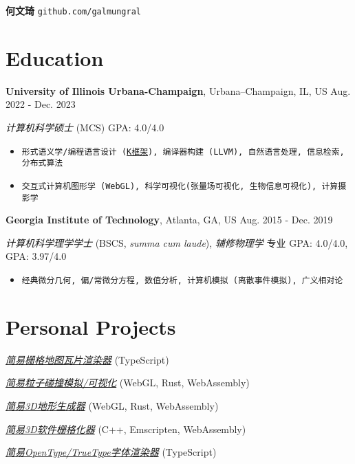 \documentclass[11pt,twocolumn]{article}
\begin{document}
\newpage 

{\Huge\textbf{何文琦}} \quad \texttt{github.com/galmungral}


\section*{Education}

\textbf{University of Illinois Urbana-Champaign}, Urbana–Champaign, IL, US \hfill Aug. 2022 - Dec. 2023

\textit{计算机科学硕士} (MCS)  \hfill GPA: 4.0/4.0 

\begin{itemize}
\item \texttt{形式语义学/编程语言设计 (\href{https://kframework.org/}{K框架}), 编译器构建 (LLVM), 自然语言处理, 信息检索, 分布式算法}
\item \texttt{交互式计算机图形学 (WebGL), 科学可视化(张量场可视化, 生物信息可视化), 计算摄影学}
\end{itemize}

\textbf{Georgia Institute of Technology}, Atlanta, GA, US \hfill Aug. 2015 - Dec. 2019

\textit{计算机科学理学学士} (BSCS, \textit{summa cum laude}), \textit{辅修物理学} \hfill 专业 GPA: 4.0/4.0, GPA: 3.97/4.0

\begin{itemize}
\item \texttt{经典微分几何, 偏/常微分方程, 数值分析, 计算机模拟 (离散事件模拟), 广义相对论}
\end{itemize}

\section*{Personal Projects}

\href{https://galmungral.github.io/mercator}{\textit{简易栅格地图瓦片渲染器}} \hfill (TypeScript)

\href{https://galmungral.github.io/particle-simulation}{\textit{简易粒子碰撞模拟/可视化}} 
\hfill (WebGL, Rust, WebAssembly)

\href{https://galmungral.github.io/terrain-generator}{\textit{简易3D地形生成器}} \hfill (WebGL, Rust, WebAssembly)

\href{https://galmungral.github.io/rasterizer?file=billboard.txt}{\textit{简易3D软件栅格化器}} \hfill (C++, Emscripten, WebAssembly)

\href{https://galmungral.github.io/text2svg}{\textit{简易OpenType/TrueType字体渲染器}} \hfill (TypeScript)
\end{document}
